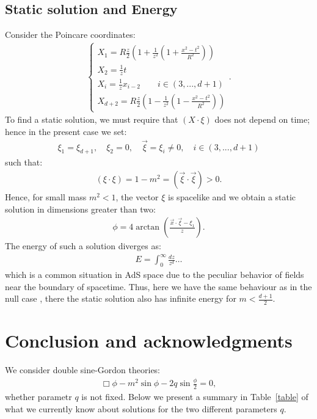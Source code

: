 \documentclass{article}
\begin{document}
\subsection{Static solution and Energy}
Consider the Poincare coordinates:
\begin{align}
\label{Poincare}
\begin{cases}
X_{1}=R{\frac {z}{2}}\left(1+{\frac {1}{z^2}}\left(1+\frac{{x}^{2}-t^{2}}{R^2}\right)\right)
\\X_{2}={\frac {1}{z }}t
\\X_{i}={\frac {1}{z }}x_{i-2}  \quad \quad i \in (3,...,d+1)
\\X_{d+2}=R{\frac { z}{2}}\left(1-\frac{1}{z^2}\left(1-\frac{{x}^{2}-t^{2}}{R^2}\right)\right)\end{cases}.
\end{align}
To find a static solution, we must require that $(X \cdot \xi)$ does not depend on time; hence in the present case we set: 
\begin{align}
    \xi_1=\xi_{d+1}, \quad  \xi_2=0, \quad \vec\xi=\xi_i \ne 0, \quad i \in  (3,...,d+1)
\end{align}
such that:
\begin{align}
    (\xi \cdot \xi) = 1-m^2=(\vec{\xi}\cdot\vec{\xi})  >0.
\end{align}
Hence, for small mass $m^2<1$, the vector $\xi$ is spacelike and we obtain a static solution in dimensions greater than two:
\begin{align}
    \phi=4\arctan \left(\frac{\vec{x} \cdot \vec{\xi}-\xi_1}{z}\right).
\end{align}
The energy of such a solution diverges as:
\begin{align}
    E= \int_{0}^{\infty} \frac{dz}{z^d}\ldots
\end{align}
which is a common situation in AdS space due to the peculiar behavior of fields near the boundary of spacetime. Thus, here we have the same behaviour as in the null case \cite{Akhmedov:2026msi}, there the static solution also has infinite energy for $m<\frac{d+1}{2}$.

\section{Conclusion and acknowledgments}
We consider double sine-Gordon theories:
\begin{align}
    \Box \phi - m^2 \sin \phi - 2 q \sin \frac{\phi}{2} = 0,
\end{align}
whether parametr $q$ is not fixed. Below we present a summary in Table~\ref{table} of what we currently know about solutions for the two different parameters $q$.
\end{document}
